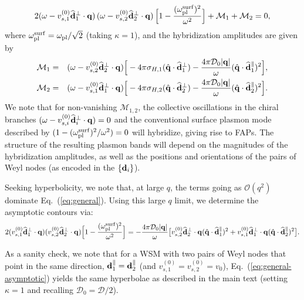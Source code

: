 \documentclass[aps,twocolumn,prl,groupedaddress]{revtex4}
\newcommand{\bea}{\begin{eqnarray}}
\newcommand{\eea}{\end{eqnarray}}
\renewcommand{\vec}[1]{{\bf #1}}
\begin{document}
\begin{widetext}
\begin{align}
 2(\omega - v_{s,1}^{(0)} \widehat{\vec{d}}_1^\perp  \cdot \vec q) \, (\omega - v_{s,2}^{(0)} \widehat{\vec{d}}_2^\perp  \cdot \vec q)\, \Big[1- \frac{(\omega_{\rm pl}^{\rm surf})^2}{\omega^2}\Big]  
 + \mathcal{M}_1 + \mathcal{M}_2 =0,
\label{eq:general}
\end{align}
where $\omega_{\rm pl}^{\rm surf} = \omega_{\rm pl}/\sqrt{2}$ (taking $\kappa =1$), and the hybridization amplitudes are given by
\bea
\nonumber \mathcal{M}_1 &=&  (\omega - v_{s,2}^{(0)} \widehat{\vec{d}}_2^\perp  \cdot \vec q) \Big[- 4\pi \sigma_{H,1} (\hat{\vec{q}} \cdot \widehat{\vec{d}}_1^\perp) - \frac{4\pi \mathcal{D}_0|\vec q|}{\omega} (\hat{\vec{q}} \cdot \widehat{\vec{d}}_1^\parallel )^2\Big],\\
\mathcal{M}_2 &=&  (\omega - v_{s,1}^{(0)} \widehat{\vec{d}}_1^\perp  \cdot \vec q) \Big[-4\pi \sigma_{H,2} (\hat{\vec{q}} \cdot \widehat{\vec{d}}_2^\perp) - \frac{4\pi \mathcal{D}_0|\vec q|}{\omega} (\hat{\vec{q}} \cdot \widehat{\vec{d}}_2^\parallel )^2\Big].
\eea
We note that for non-vanishing $\mathcal{M}_{1,2}$, the collective oscillations in the chiral branches $(\omega - v_{s,i}^{(0)} \widehat{\vec{d}}_i^\perp  \cdot \vec q) = 0$ and the conventional surface plasmon mode described by $(1- ({\omega}_{\rm pl}^{\rm surf})^2/\omega^2) = 0$ will hybridize, giving rise to FAPs. 
The structure of the resulting plasmon bands will depend on the magnitudes of the hybridization amplitudes, as well as the positions and orientations of the pairs of Weyl nodes (as encoded in the $\{\vec d_i\}$).

Seeking hyperbolicity, we note that, at large $q$, the terms going as $\mathcal{O}(q^2)$ dominate Eq.~(\ref{eq:general}).
Using this large $q$ limit, we determine the asymptotic contours via:
\begin{align}
 2  (v_{s,1}^{(0)} \widehat{\vec{d}}_1^\perp  \cdot \vec q) (v_{s,2}^{(0)} \widehat{\vec{d}}_2^\perp  \cdot \vec q)\Big[1- \frac{(\omega_{\rm pl}^{\rm surf})^2}{\omega^2}\Big] = - \frac{4\pi \mathcal{D}_0 |\vec q|}{\omega} \big[ v_{s,2}^{(0)} \widehat{\vec{d}}_2^\perp  \cdot \vec q (\hat{\vec{q}} \cdot \widehat{\vec{d}}_1^\parallel )^2 + v_{s,1}^{(0)} \widehat{\vec{d}}_1^\perp  \cdot \vec q (\hat{\vec{q}} \cdot \widehat{\vec{d}}_2^\parallel )^2  \big].
\label{eq:general-asymptotic}
\end{align}
\end{widetext}
As a sanity check, we note that for a WSM with two pairs of Weyl nodes that point in the same direction, $\vec d^\parallel_1 = \vec d^\parallel_2$ (and $v_{s,1}^{(0)} = v_{s,2}^{(0)} = v_0$), Eq.~(\ref{eq:general-asymptotic}) yields the same hyperbolae as described in the main text (setting $\kappa=1$ and recalling $\mathcal{D}_0 = \mathcal{D}/2$).
\end{document}

